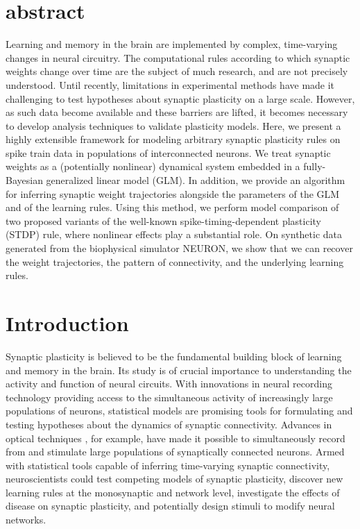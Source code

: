 \section{abstract}
Learning and memory in the brain are implemented by complex, time-varying changes in neural circuitry. The computational rules according to which synaptic weights change over time are the subject of much research, and are not precisely understood. Until recently, limitations in experimental methods have made it challenging to test hypotheses about synaptic plasticity on a large scale.  However, as such data become available and these barriers are lifted, it becomes necessary to develop analysis techniques to validate plasticity models.  Here, we present a highly extensible framework for modeling arbitrary synaptic plasticity rules on spike train data in populations of interconnected neurons. We treat synaptic weights as a (potentially nonlinear) dynamical system embedded in a fully-Bayesian generalized linear model (GLM). In addition, we provide an algorithm for inferring synaptic weight trajectories alongside the parameters of the GLM and of the learning rules. Using this method, we perform model comparison of two proposed variants of the well-known spike-timing-dependent plasticity (STDP) rule, where nonlinear effects play a substantial role. On synthetic data generated from the biophysical simulator NEURON, we show that we can recover the weight trajectories, the pattern of connectivity, and the underlying learning rules.


\section{Introduction}
Synaptic plasticity is believed to be the fundamental building block of learning and memory in the brain. Its study is of crucial importance to understanding the activity and function of neural circuits. With innovations in neural recording technology providing access to the simultaneous activity of increasingly large populations of neurons, statistical models are promising tools for formulating and testing hypotheses about the dynamics of synaptic connectivity. Advances in optical techniques \cite{Packer-2012, Hochbaum-2014}, for example, have made it possible to simultaneously record from and stimulate large populations of synaptically connected neurons. Armed with statistical tools capable of inferring time-varying synaptic connectivity, neuroscientists could test competing models of synaptic plasticity, discover new learning rules at the monosynaptic and network level, investigate the effects of disease on synaptic plasticity, and potentially design stimuli to modify neural networks.

